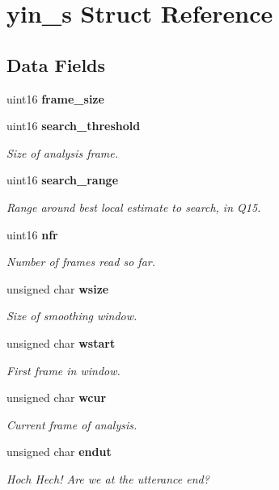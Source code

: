 \section{yin\+\_\+s Struct Reference}
\label{structyin__s}
\subsection*{Data Fields}
\begin{DoxyCompactItemize}
\item 
\mbox{\label{structyin__s_a25a7e0400397ab1fcbf82f4d0568722a}} 
uint16 {\bfseries frame\+\_\+size}
\item 
uint16 \textbf{ search\+\_\+threshold}
\begin{DoxyCompactList}\small\item\em Size of analysis frame. \end{DoxyCompactList}\item 
\mbox{\label{structyin__s_a208dfba1535fdd31962e687d82913dfd}} 
uint16 \textbf{ search\+\_\+range}
\begin{DoxyCompactList}\small\item\em Range around best local estimate to search, in Q15. \end{DoxyCompactList}\item 
uint16 \textbf{ nfr}
\begin{DoxyCompactList}\small\item\em Number of frames read so far. \end{DoxyCompactList}\item 
unsigned char \textbf{ wsize}
\begin{DoxyCompactList}\small\item\em Size of smoothing window. \end{DoxyCompactList}\item 
unsigned char \textbf{ wstart}
\begin{DoxyCompactList}\small\item\em First frame in window. \end{DoxyCompactList}\item 
unsigned char \textbf{ wcur}
\begin{DoxyCompactList}\small\item\em Current frame of analysis. \end{DoxyCompactList}\item 
\mbox{\label{structyin__s_a61ca0fc8444a1bdde10aca37dc9f0f56}} 
unsigned char \textbf{ endut}
\begin{DoxyCompactList}\small\item\em Hoch Hech! Are we at the utterance end? \end{DoxyCompactList}\item 

\end{DoxyCompactItemize}
